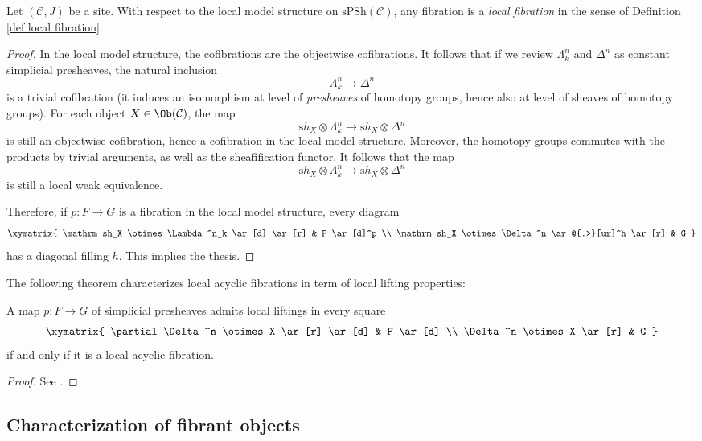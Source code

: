 \begin{lemma}
Let $(\mathcal C,J)$ be a site. With respect to the local model structure on $\mathrm{sPSh}(\mathcal C)$, any fibration is a \emph{local fibration} in the sense of Definition \ref{def local fibration}.
\end{lemma}

\begin{proof}
In the local model structure, the cofibrations are the objectwise cofibrations. It follows that if we review $\Lambda^n_k$ and $\Delta^n$ as constant simplicial presheaves, the natural inclusion
\[
\Lambda^n_k \to \Delta^n
\]
is a trivial cofibration (it induces an isomorphism at level of \emph{presheaves} of homotopy groups, hence also at level of sheaves of homotopy groups). For each object $X \in \Ob(\mathcal C)$, the map
\[
\mathrm sh_X \otimes \Lambda^n_k \to \mathrm sh_X \otimes \Delta^n
\]
is still an objectwise cofibration, hence a cofibration in the local model structure. Moreover, the homotopy groups commutes with the products by trivial arguments, as well as the sheafification functor. It follows that the map
\[
\mathrm sh_X \otimes \Lambda^n_k \to \mathrm sh_X \otimes \Delta^n
\]
is still a local weak equivalence.

Therefore, if $p \colon F \to G$ is a fibration in the local model structure, every diagram
\[
\xymatrix{ \mathrm sh_X \otimes \Lambda^n_k \ar[d] \ar[r] & F \ar[d]^p \\ \mathrm sh_X \otimes \Delta^n \ar@{.>}[ur]^h \ar[r] & G }
\]
has a diagonal filling $h$. This implies the thesis.
\end{proof}

The following theorem characterizes local acyclic fibrations in term of local lifting properties:

\begin{thm} \label{thm local acyclic fibrations}
A map $p \colon F \to G$ of simplicial presheaves admits local liftings in every square
\[
\xymatrix{
\partial \Delta^n \otimes X \ar[r] \ar[d] & F \ar[d] \\ \Delta^n \otimes X \ar[r] & G
}
\]
if and only if it is a local acyclic fibration.
\end{thm}

\begin{proof}
See .
\end{proof}

\subsection{Characterization of fibrant objects}

